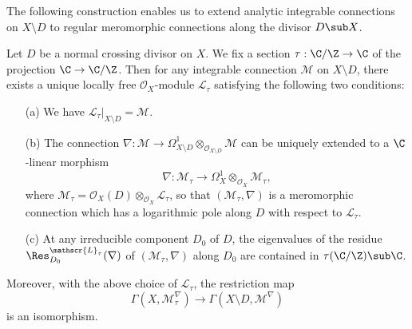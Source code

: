 The following construction enables us to extend analytic integrable connections on $X\setminus D$ to regular meromorphic connections along the divisor $D\sub X$.

\begin{theorem}\label{D-module mero conn logarithmic pole unique extension}
Let $D$ be a normal crossing divisor on $X$. We fix a section $\tau:\C/\Z\to\C$ of the projection $\C\to\C/\Z$. Then for any integrable connection $\mathscr{M}$ on $X\setminus D$, there exists a unique locally free $\mathscr{O}_X$-module $\mathscr{L}_\tau$ satisfying the following two conditions:
\begin{enumerate}
    \item[(a)] We have $\mathscr{L}_\tau|_{X\setminus D}=\mathscr{M}$.
    \item[(b)] The connection $\nabla:\mathscr{M}\to\Omega_{X\setminus D}^1\otimes_{\mathscr{O}_{X\setminus D}}\mathscr{M}$ can be uniquely extended to a $\C$-linear morphism
    \[\nabla:\mathscr{M}_\tau\to\Omega_X^1\otimes_{\mathscr{O}_X}\mathscr{M}_\tau,\]
    where $\mathscr{M}_\tau=\mathscr{O}_X(D)\otimes_{\mathscr{O}_X}\mathscr{L}_\tau$, so that $(\mathscr{M}_\tau,\nabla)$ is a meromorphic connection which has a logarithmic pole along $D$ with respect to $\mathscr{L}_\tau$.
    \item[(c)] At any irreducible component $D_0$ of $D$, the eigenvalues of the residue $\Res^{\mathscr{L}_\tau}_{D_0}(\nabla)$ of $(\mathscr{M}_\tau,\nabla)$ along $D_0$ are contained in $\tau(\C/\Z)\sub\C$.
\end{enumerate}
Moreover, with the above choice of $\mathscr{L}_\tau$, the restriction map
\[\Gamma(X,\mathscr{M}_\tau^\nabla)\to \Gamma(X\setminus D,\mathscr{M}^\nabla)\]
is an isomorphism.
\end{theorem}
